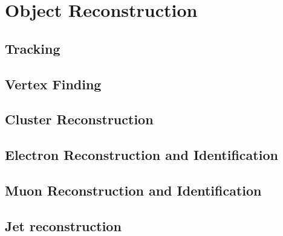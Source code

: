 \graphicspath{{Chapters/Reconstruction/Figures/}}
\chapter{Object Reconstruction}
\label{chap:Reconstruction}
\section{Tracking}
\section{Vertex Finding}
\section{Cluster Reconstruction}
\section{Electron Reconstruction and Identification}
\section{Muon Reconstruction and Identification}
\section{Jet reconstruction}
